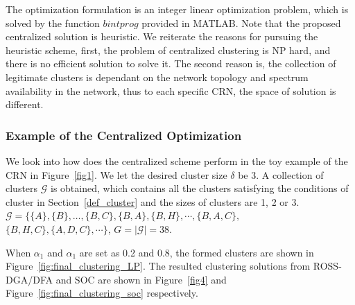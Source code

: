 \documentclass[10pt,journal,compsoc]{IEEEtran}
\theoremstyle{mytheoremstyle}
\theoremstyle{mytheoremstyle}
\theoremstyle{mytheoremstyle}
\begin{document}
The optimization formulation is an integer linear optimization problem, which is solved by the function $bintprog$ provided in MATLAB.
Note that the proposed centralized solution is heuristic.
We reiterate the reasons for pursuing the heuristic scheme, first, the problem of centralized clustering is NP hard, and there is no efficient solution to solve it.
The second reason is, the collection of legitimate clusters is dependant on the network topology and spectrum availability in the network, thus to each specific CRN, the space of solution is different.


\subsubsection{Example of the Centralized Optimization}
We look into how does the centralized scheme perform in the toy example of the CRN in Figure~\ref{fig1}.
%
We let the desired cluster size $\delta$ be 3.
A collection of clusters $\mathcal{G}$ is obtained, which contains all the clusters satisfying the conditions of cluster in Section~\ref{def_cluster} and the sizes of clusters are 1, 2 or 3. 
$\mathcal{G}=\{\{A\}, \{B\},\dots,\{B,C\},\{B,A\},\{B,H\},\cdots,\{B,A,C\},$\\$\{B,H,C\}, \{A,D,C\},\cdots\}$, $G = |\mathcal{G}|=38$.

When $\alpha_1$ and $\alpha_1$ are set as 0.2 and 0.8, the formed clusters are shown in Figure~\ref{fig:final_clustering_LP}.
The resulted clustering solutions from ROSS-DGA/DFA and SOC are shown in Figure~\ref{fig4} and Figure~\ref{fig:final_clustering_soc} respectively.%
\end{document}
